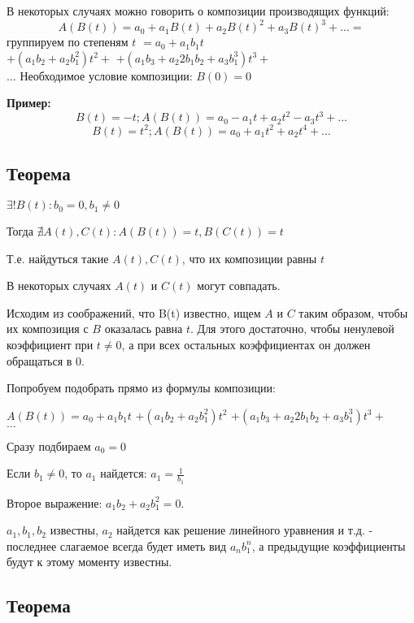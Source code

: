 В некоторых случаях можно говорить о композиции производящих функций:
$$
A(B(t)) = a_0 + a_1 B(t) + a_2 B(t)^{2} + a_3 B(t)^{3} + \ldots =
$$
группируем по степеням $ t $
$= a_{0} + a_{1}b_{1}t $ \\
$+ (a_{1}b_{2} + a_{2}b_{1}^{2} ) t^{2} + $
$+ (a_{1}b_{3} + a_{2}2 b_{1} b_{2} + a_{3}b_{1}^{3}) t^{3} + $ \\
$\ldots$
Необходимое условие композиции: $B(0) = 0$

\textbf{Пример:}
$$
B(t) = -t; A(B(t)) = a_{0} - a_{1}t + a_{2} t^{2} - a_{3} t^{3} + \ldots
$$
$$
B(t) = t^{2}; A(B(t)) = a_{0} + a_{1} t^{2} + a_{2} t^{4} + \ldots
$$

\subsection{Теорема}
$\exists! B(t) : b_{0} = 0, b_{1} \neq 0$

Тогда $\nexists A(t), C(t) :  A(B(t)) = t, B(C(t)) = t$

Т.е. найдуться такие $ A(t), C(t) $, что их композиции равны $ t $

В некоторых случаях $ A(t) $ и $ C(t) $ могут совпадать.

Исходим из соображений, что B(t) известно, ищем $ A $ и $ C $ таким образом, чтобы 
их композиция с $ B $ оказалась равна $ t $.
Для этого достаточно, чтобы ненулевой коэффициент при $ t \neq 0$, а при всех остальных коэффициентах он должен обращаться в 0.

Попробуем подобрать прямо из формулы композиции:

$A(B(t))= a_{0} + a_{1}b_{1}t $ 
$+ (a_{1}b_{2} + a_{2}b_{1}^{2} ) t^{2} $
$+ (a_{1}b_{3} + a_{2}2 b_{1} b_{2} + a_{3}b_{1}^{3}) t^{3} + $ \\
$\ldots$

Сразу подбираем $ a_{0} = 0 $ 

Если $ b_{1} \neq 0 $, то $ a_{1} $ найдется: $a_{1} = \frac{1}{b_{1}}$

Второе выражение: $a_{1}b_{2} + a_{2}b_{1}^{2} = 0$. 

$ a_{1}, b_{1}, b_{2} $ известны,
$ a_{2} $ найдется как решение линейного уравнения и т.д. - последнее слагаемое
всегда будет иметь вид $ a_{n} b_{1}^{n} $, а предыдущие коэффициенты будут 
к этому моменту известны.


\subsection{Теорема}

